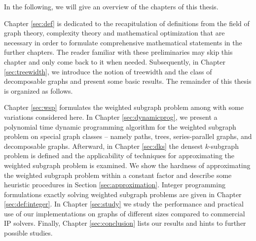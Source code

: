 In the following, we will give an overview of the chapters of this thesis.\medskip

Chapter \ref{sec:def} is dedicated to the recapitulation of definitions from the field of graph theory, complexity theory and mathematical optimization that are necessary in order to formulate comprehensive mathematical statements in the further chapters. The reader familiar with these preliminaries may skip this chapter and only come back to it when needed. Subsequently, in Chapter \ref{sec:treewidth}, we introduce the notion of treewidth and the class of decomposable graphs and present some basic results. The remainder of this thesis is organized as follows.\medskip

Chapter \ref{sec:wsp} formulates the weighted subgraph problem among with some variations considered here. In Chapter \ref{sec:dynamicprog}, we present a polynomial time dynamic programming algorithm for the weighted subgraph problem on special graph classes -- namely paths, trees, series-parallel graphs, and decomposable graphs. Afterward, in Chapter \ref{sec:dks} the densest $k$-subgraph problem is defined and the applicability of techniques for approximating the weighted subgraph problem is examined. We show the hardness of approximating the weighted subgraph problem within a constant factor and describe some heuristic procedures in Section \ref{sec:approximation}. Integer programming formulations exactly solving weighted subgraph problems are given in Chapter \ref{sec:def:integer}. In Chapter \ref{sec:study} we study the performance and practical use of our implementations on graphs of different sizes compared to commercial IP solvers. Finally, Chapter \ref{sec:conclusion} lists our results and hints to further possible studies.